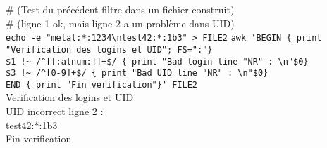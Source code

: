 \documentclass[10pt,landscape]{article}
\begin{document}
\begin{multicols}{3}
\# (Test du précédent filtre dans un fichier construit)\\
\# (ligne 1 ok, mais ligne 2 a un problème dans UID)\\
\verb!echo -e "metal:*:1234\ntest42:*:1b3" > FILE2!
\verb!awk 'BEGIN { print "Verification des logins et UID"; FS=":"}!\\
\verb|$1 !~ /^[[:alnum:]]+$/ { print "Bad login line "NR" : \n"$0}|\\
\verb|$3 !~ /^[0-9]+$/ { print "Bad UID line "NR" : \n"$0}|\\
\verb!END { print "Fin verification"}' FILE2!\\
\textrightarrow Verification des logins et UID\\
\textrightarrow UID incorrect ligne 2 :\\
\textrightarrow test42:*:1b3\\
\textrightarrow Fin verification\\



\end{multicols}
\end{document}
